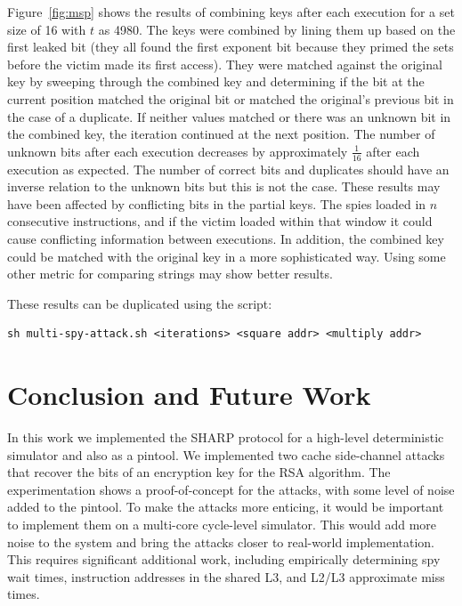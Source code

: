 \documentclass[12pt]{article}
\begin{document}
Figure~\ref{fig:msp} shows the results of combining keys after each execution for a set size of 16 with $t$ as 4980. 
The keys were combined by lining them up based on the first leaked bit (they all found the first exponent bit because they primed the sets before the victim made its first access). 
They were matched against the original key by sweeping through the combined key and determining if the bit at the current position matched the original bit or matched the original's previous bit in the case of a duplicate.
If neither values matched or there was an unknown bit in the combined key, the iteration continued at the next position.
The number of unknown bits after each execution decreases by approximately $\frac{1}{16}$ after each execution as expected.
The number of correct bits and duplicates should have an inverse relation to the unknown bits but this is not the case.
These results may have been affected by conflicting bits in the partial keys.
The spies loaded in $n$ consecutive instructions, and if the victim loaded within that window it could cause conflicting information between executions.
In addition, the combined key could be matched with the original key in a more sophisticated way.
Using some other metric for comparing strings may show better results.

These results can be duplicated using the script:
\begin{verbatim}
sh multi-spy-attack.sh <iterations> <square addr> <multiply addr> 
\end{verbatim}

\section{Conclusion and Future Work}

In this work we implemented the SHARP protocol for a high-level deterministic simulator and also as a pintool.
We implemented two cache side-channel attacks that recover the bits of an encryption key for the RSA algorithm.
The experimentation shows a proof-of-concept for the attacks, with some level of noise added to the pintool.
To make the attacks more enticing, it would be important to implement them on a multi-core cycle-level simulator.
This would add more noise to the system and bring the attacks closer to real-world implementation.
This requires significant additional work, including empirically determining spy wait times, instruction addresses in the shared L3, and L2/L3 approximate miss times.
\end{document}
